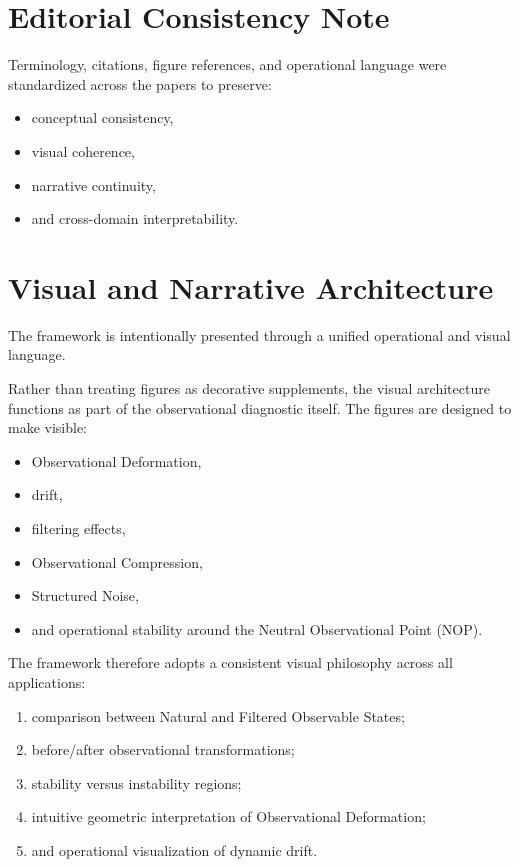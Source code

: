\documentclass[11pt]{article}
\begin{document}
\section*{Editorial Consistency Note}

Terminology, citations, figure references, and operational language were standardized across the papers to preserve:
\begin{itemize}
\item conceptual consistency,
\item visual coherence,
\item narrative continuity,
\item and cross-domain interpretability.
\end{itemize}





\section{Visual and Narrative Architecture}

The framework is intentionally presented through a unified operational and visual language.

Rather than treating figures as decorative supplements, the visual architecture functions as part of the observational diagnostic itself. The figures are designed to make visible:
\begin{itemize}
\item Observational Deformation,
\item drift,
\item filtering effects,
\item Observational Compression,
\item Structured Noise,
\item and operational stability around the Neutral Observational Point (NOP).
\end{itemize}

The framework therefore adopts a consistent visual philosophy across all applications:
\begin{enumerate}
\item comparison between Natural and Filtered Observable States;
\item before/after observational transformations;
\item stability versus instability regions;
\item intuitive geometric interpretation of Observational Deformation;
\item and operational visualization of dynamic drift.
\end{enumerate}
\end{document}
